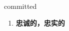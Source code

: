 
\begin{frame}
{\huge committed}
\begin{center}
\begin{enumerate}\Large
  \item \textbf{忠诚的，忠实的}
\end{enumerate}
\end{center}
\end{frame}
